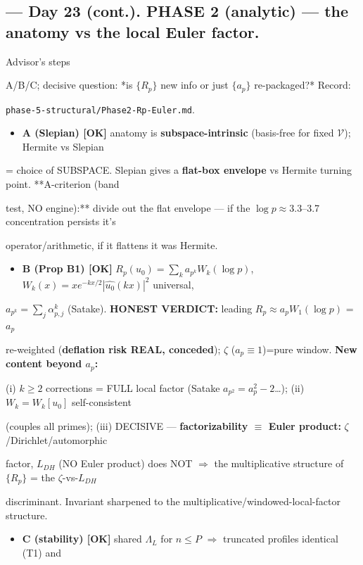 \documentclass[10pt]{article}
\begin{document}
\subsection*{ --- Day 23 (cont.). PHASE 2 (analytic) --- the anatomy vs the local Euler factor.}
Advisor's steps\par
A/B/C; decisive question: *is $\{R_p\}$ new info or just $\{a_p\}$ re-packaged?* Record:\par
\texttt{phase-5-structural/Phase2-Rp-Euler.md}.\par
\begin{itemize}
\item \textbf{A (Slepian) [OK]} anatomy is \textbf{subspace-intrinsic} (basis-free for fixed $\mathcal V$); Hermite vs Slepian
\end{itemize}
  = choice of SUBSPACE. Slepian gives a \textbf{flat-box envelope} vs Hermite turning point. **A-criterion (band\par
  test, NO engine):** divide out the flat envelope --- if the $\log p\approx3.3$--3.7 concentration persists it's\par
  operator/arithmetic, if it flattens it was Hermite.\par
\begin{itemize}
\item \textbf{B (Prop B1) [OK]} $R_p(u_0)=\sum_k a_{p^k}W_k(\log p)$, $W_k(x)=x e^{-kx/2}|\widehat{u_0}(kx)|^2$ universal,
\end{itemize}
  $a_{p^k}=\sum_j\alpha_{p,j}^k$ (Satake). \textbf{HONEST VERDICT:} leading $R_p\approx a_p W_1(\log p)$ = $a_p$\par
  re-weighted (\textbf{deflation risk REAL, conceded}); \ensuremath{\zeta} ($a_p\equiv1$)=pure window. \textbf{New content beyond $a_p$:}\par
  (i) $k\ge2$ corrections = FULL local factor (Satake $a_{p^2}=a_p^2-2$\ldots); (ii) $W_k=W_k[u_0]$ self-consistent\par
  (couples all primes); (iii) DECISIVE --- \textbf{factorizability $\equiv$ Euler product:} \ensuremath{\zeta}/Dirichlet/automorphic\par
  factor, $L_{DH}$ (NO Euler product) does NOT \ensuremath{\Rightarrow} the multiplicative structure of $\{R_p\}$ = the \ensuremath{\zeta}-vs-$L_{DH}$\par
  discriminant. Invariant sharpened to the multiplicative/windowed-local-factor structure.\par
\begin{itemize}
\item \textbf{C (stability) [OK]} shared $\Lambda_L$ for $n\le P$ \ensuremath{\Rightarrow} truncated profiles identical (T1) and
\end{itemize}
\end{document}
